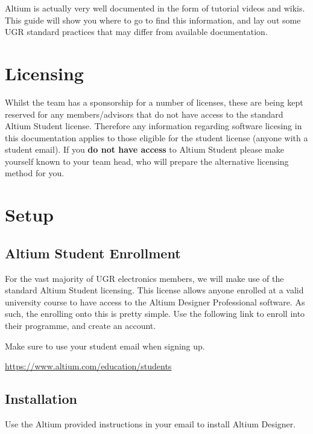 \documentclass[12pt,a4paper]{article}
\begin{document}
Altium is actually very well documented in the form of tutorial videos and wikis. This guide will show you where to go to find this information, and lay out some UGR standard practices that may differ from available documentation.

\section{Licensing}
Whilst the team has a sponsorship for a number of licenses, these are being kept reserved for any members/advisors that do not have access to the standard Altium Student license. Therefore any information regarding software licesing in this documentation applies to those eligible for the student license (anyone with a student email). If you \textbf{do not have access} to Altium Student please make yourself known to your team head, who will prepare the alternative licensing method for you.

\newpage
\section{Setup}

\subsection{Altium Student Enrollment}
For the vast majority of UGR electronics members, we will make use of the standard Altium Student licensing. This license allows anyone enrolled at a valid university course to have access to the Altium Designer Professional software. As such, the enrolling onto this is pretty simple. Use the following link to enroll into their programme, and create an account. 

\begin{note}
Make sure to use your student email when signing up.
\end{note}

\begin{minipage}{\textwidth}
\centering
\href{https://www.altium.com/education/students}{https://www.altium.com/education/students}
\end{minipage}

\subsection{Installation}
Use the Altium provided instructions in your email to install Altium Designer.\\
\end{document}
